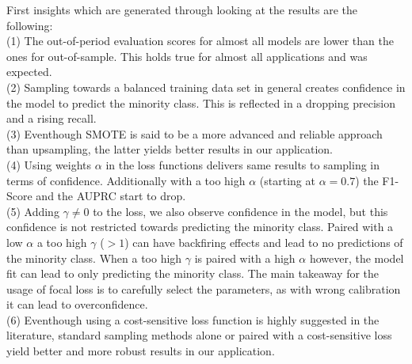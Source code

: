 \documentclass[12pt,titlepage]{article}
\begin{document}
First insights which are generated through looking at the results are the following: \\
(1) The out-of-period evaluation scores for almost all models are lower than the ones for out-of-sample. This holds true for almost all applications and was expected. \\
(2) Sampling towards a balanced training data set in general creates confidence in the model to predict the minority class. This is reflected in a dropping precision and a rising recall. \\
(3) Eventhough SMOTE is said to be a more advanced and reliable approach than upsampling, the latter yields better results in our application.\\
(4) Using weights $\alpha$ in the loss functions delivers same results to sampling in terms of confidence. Additionally with a too high $\alpha$ (starting at $\alpha=0.7$) the F1-Score and the AUPRC start to drop.\\
(5) Adding $\gamma\neq0$ to the loss, we also observe confidence in the model, but this confidence is not restricted towards predicting the minority class. Paired with a low $\alpha$ a too high $\gamma$ ($>1$) can have backfiring effects and lead to no predictions of the minority class. When a too high $\gamma$ is paired with a high $\alpha$ however, the model fit can lead to only predicting the minority class. The main takeaway for the usage of focal loss is to carefully select the parameters, as with wrong calibration it can lead to overconfidence. \\
(6) Eventhough using a cost-sensitive loss function is highly suggested in the literature, standard sampling methods alone or paired with a cost-sensitive loss yield better and more robust results in our application. \\
\end{document}

